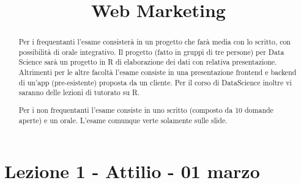 \documentclass[11pt]{article}
\title{\textbf{Web Marketing}}
\author{}
\date{}
\begin{document}
\maketitle
\begin{abstract}
  Per i frequentanti l'esame consisterà in un progetto che farà media con lo scritto, con possibilità di orale integrativo.
  Il progetto (fatto in gruppi di tre persone) per Data Science sarà un progetto in R di elaborazione dei dati con relativa presentazione.
  Altrimenti per le altre facoltà l'esame consiste in una presentazione frontend e backend di un'app (pre-esistente) proposta da un cliente.
  Per il corso di DataScience inoltre vi saranno delle lezioni di tutorato su R.
  
  Per i non frequentanti l'esame consiste in uno scritto (composto da 10 domande aperte) e un orale.
  L'esame comunque verte solamente sulle slide.
\end{abstract}

\section{Lezione 1 - Attilio - 01 marzo}
\end{document}
